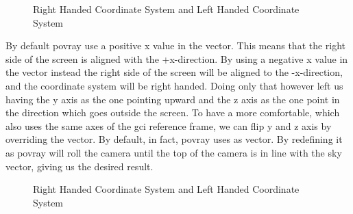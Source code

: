 \begin{figure}
  \centering
  \qquad
  \caption{Right Handed Coordinate System and Left Handed Coordinate System}
  \label{fig:frames}
\end{figure}

By default \acrshort{povray} use a positive x value in the  vector. This means that the right side of the screen is aligned with the +x-direction. By using a negative x value in the  vector instead the right side of the screen will be aligned to the -x-direction, and the coordinate system will be right handed.
Doing only that however left us having the y axis as the one pointing upward and the z axis as the one point in the direction which goes outside the screen.
To have a more comfortable, which also uses the same axes of the \acrshort{gci} reference frame, we can flip y and z axis by overriding the  vector.
By default, in fact, \acrshort{povray} uses  as  vector. By redefining it as   \acrshort{povray} will roll the camera until the top of the camera is in line with the sky vector, giving us the desired result.

\begin{figure}
  \centering
  \qquad
  \qquad
  \caption{Right Handed Coordinate System and Left Handed Coordinate System}
  \label{fig:framesComparison}
\end{figure}

